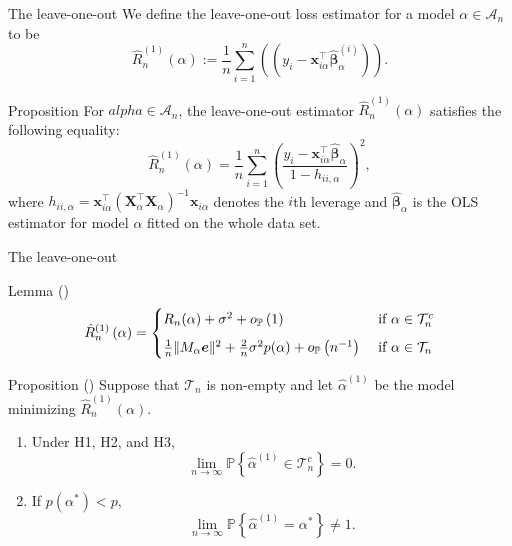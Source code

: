 \documentclass{beamer}
\newcommand{\0}{\emptyset}
\newcommand{\prob}{\mathbb{P}}
\newcommand{\paren}[1]{\left(#1 \right)}
\newcommand{\set}[1]{\left\{ #1 \right\}}
\newcommand{\norm}[1]{|\hspace{-1pt}|#1 |\hspace{-1pt}|}
\newcommand{\normsq}[1]{\norm{#1}^{2}}
\newcommand{\Acal}{\mathcal{A}_{n}}
\newcommand{\Tcal}{\mathcal{T}_{n}}
\newcommand{\X}{\boldsymbol{X}}
\newcommand{\x}{\boldsymbol{x}}
\newcommand{\e}{\boldsymbol{e}}
\newcommand{\bbetahat}{\boldsymbol{\hat{\beta}}}
\newcommand{\alphahat}[1]{\hat{\alpha}^{#1}}
\newcommand{\loocv}[1]{\hat{R}^{(1)}_{n}\paren{#1}}
\newcommand{\op}[1]{o_{\prob}\paren{#1}}
\newcommand{\1}{\mathmybb{1}}
\begin{document}
\begin{frame}{The leave-one-out}
   We define the leave-one-out loss estimator for a model \(\alpha\in\Acal\) to be 
\[\loocv{\alpha} := \frac{1}{n}\sum_{i=1}^{n}\paren{(y_{i} - \x_{i\alpha}^{\top}\bbetahat_{\alpha}^{(i)})}.\]

\begin{block}{Proposition}
  For \(alpha\in\Acal\), the leave-one-out estimator \(\loocv{\alpha}\) satisfies the following equality:
    \[\loocv{\alpha}= \frac{1}{n}\sum_{i=1}^{n}\paren{\frac{y_{i}-\x_{i\alpha}^{\top}\bbetahat_{\alpha}}{1-h_{ii,\alpha}}}^{2},\]
    where \(h_{ii,\alpha} = \x_{i\alpha}^{\top}{(\X_{\alpha}^{\top}\X_{\alpha})}^{-1}\x_{i\alpha}\) denotes the \(i\)th leverage and \(\bbetahat_{\alpha}\) is the OLS estimator for model \(\alpha\) fitted on the whole data set.
\end{block}
\end{frame}

\begin{frame}{The leave-one-out}
  \begin{block}{Lemma (\cite{shao_1993})}
    \begin{equation}
      \loocv{\alpha} = \begin{cases}
          R_{n}(\alpha) + \sigma^{2} + \op{1} &\text{ if }\alpha\in\Tcal^{c}\\[2mm]
          \frac{1}{n}\normsq{M_{\alpha}\e} + \frac{2}{n}\sigma^{2}p(\alpha) + \op{n^{-1}} &\text{ if }\alpha\in\Tcal
      \end{cases}
      \end{equation}
  \end{block}
\begin{block}{Proposition (\cite{shao_1993})}
  Suppose that \(\Tcal\) is non-empty and let \(\alphahat{(1)}\) be the model minimizing \(\loocv{\alpha}\).
    \begin{enumerate}
        \item Under H1, H2, and H3, \[\lim_{n\to\infty}\prob\set{\alphahat{(1)}\in\Tcal^{c}}=0.\]
        \item If \(p(\alpha^*) < p\), \[\lim_{n\to\infty}\prob\set{\alphahat{(1)}=\alpha^{*}}\neq 1.\]
    \end{enumerate}
\end{block}
\end{frame}
\end{document}
